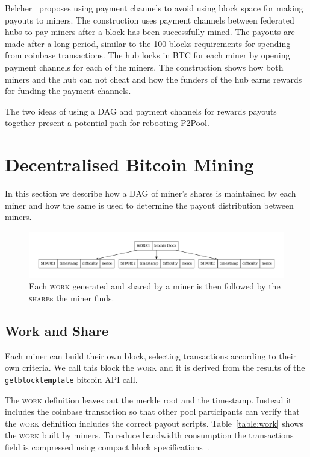 \documentclass{article}
\begin{document}
Belcher~\cite{channels-for-rewards} proposes using payment channels to
avoid using block space for making payouts to miners. The construction
uses payment channels between federated hubs to pay miners after a
block has been successfully mined. The payouts are made after a long
period, similar to the 100 blocks requirements for spending from
coinbase transactions. The hub locks in BTC for each miner by opening
payment channels for each of the miners. The construction shows how
both miners and the hub can not cheat and how the funders of the hub
earns rewards for funding the payment channels.

The two ideas of using a DAG and payment channels for rewards
payouts together present a potential path for rebooting P2Pool.

\section{Decentralised Bitcoin Mining}

In this section we describe how a DAG of miner's shares is maintained
by each miner and how the same is used to determine the payout
distribution between miners.

\begin{figure}
  \begin{center}
    \includegraphics[width=1\textwidth]{work-share}
    \caption{Each \textsc{work} generated and shared by a miner is then
      followed by the \textsc{share}s the miner finds.}\label{fig:work-share}
    \end{center}
\end{figure}

\subsection{Work and Share}

Each miner can build their own block, selecting transactions according
to their own criteria. We call this block the \textsc{work} and it is
derived from the results of the \verb|getblocktemplate| bitcoin API
call.

The \textsc{work} definition leaves out the merkle root and the
timestamp. Instead it includes the coinbase transaction so that other
pool participants can verify that the \textsc{work} definition
includes the correct payout scripts. Table~\ref{table:work} shows the
\textsc{work} built by miners. To reduce bandwidth consumption the
transactions field is compressed using compact block
specifications~\cite{compact-blocks}.
\end{document}
